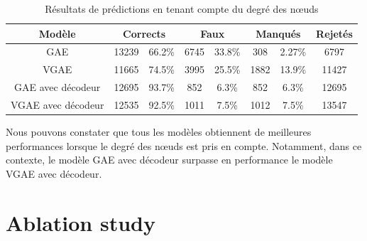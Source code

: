 \documentclass{article}
\begin{document}
\begin{table}[H]
    \centering
    \begin{tabular}{|c|c|c|c|c|c|c|c|}
        \hline
        Modèle & \multicolumn{2}{c|}{Corrects} & \multicolumn{2}{c|}{Faux} & \multicolumn{2}{c|}{Manqués} & Rejetés\\
        \hline
        GAE & 13239 & 66.2\% & 6745 & 33.8\% & 308 & 2.27\% & 6797\\
        VGAE & 11665 & 74.5\% & 3995 & 25.5\% & 1882 & 13.9\% & 11427\\
        GAE avec décodeur & 12695 & 93.7\% & 852 & 6.3\% & 852 & 6.3\% & 12695\\
        VGAE avec décodeur & 12535 & 92.5\% & 1011 & 7.5\% & 1012 & 7.5\% & 13547\\
         \hline
    \end{tabular}
    \caption{Résultats de prédictions en tenant compte du degré des nœuds}
    \label{tab:resultats_reconstruction_avec_degre}
\end{table}

Nous pouvons constater que tous les modèles obtiennent de meilleures performances lorsque le degré des nœuds est pris en compte. Notamment, dans ce contexte, le modèle GAE avec décodeur surpasse en performance le modèle VGAE avec décodeur.



\section{Ablation study}
\end{document}
